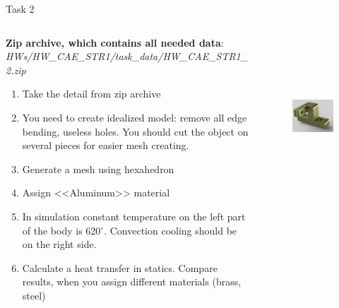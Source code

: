 \documentclass[aspectratio=169]{beamer}
\begin{document}
\begin{frame}[t]{Task 2}
    \vspace{-0.4cm}
    \begin{columns}[T,onlytextwidth]
        \begin{column}{0.59\textwidth}
            \scriptsize
            \textbf{Zip archive, which contains all needed data}: \textit{HWs/HW\_CAE\_STR1/task\_data/HW\_CAE\_STR1\_2.zip}
            \begin{enumerate}
                \item Take the detail from zip archive
                \item You need to create idealized model: remove all edge bending, useless holes. You should cut the object on several pieces for easier mesh creating.
                \item Generate a mesh using hexahedron
                \item Assign <<Aluminum>> material
                \item In simulation constant temperature on the left part of the body is 620$^\circ$. Convection cooling should be on the right side.
                \item Calculate a heat transfer in statics. Compare results, when you assign different materials (brass, steel)
            \end{enumerate}
        \end{column}
        \begin{column}{0.39\textwidth}
            \begin{figure}[H]
                \centering\includegraphics[height=6cm,width=1\textwidth,keepaspectratio]{HW_CAE_STR1_2.png}
                \label{fig:HW_CAE_STR1_2.png}
            \end{figure}
        \end{column}
    \end{columns}
\end{frame}
\end{document}

